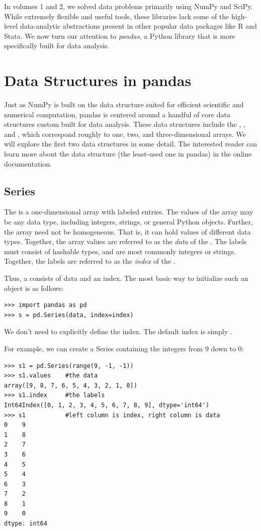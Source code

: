 \label{lab:pandas1}

In volumes 1 and 2, we solved data problems primarily using NumPy and SciPy.
While extremely flexible and useful tools, these libraries lack some of the high-level 
data-analytic abstractions present in other popular data packages like R and Stata.
We now turn our attention to \emph{pandas}, a Python library that is more specifically built
for data analysis.

\section*{Data Structures in pandas}
Just as NumPy is built on the  data structure suited for efficient scientific
and numerical computation, pandas is centered around a handful of core data structures
custom built for data analysis. These data structures include the , ,
and , which correspond roughly to one, two, and three-dimensional arrays.
We will explore the first two data structures in some detail.
The interested reader can learn more about the  data structure (the least-used one in pandas) in the online documentation.

\subsection*{Series}
The  is a one-dimensional array with labeled entries. The values of the array may be
any data type, including integers, strings, or general Python objects. Further, the array
need not be homogeneous. That is, it can hold values of different data types. Together,
the array values are referred to as the \emph{data} of the .
The labels must consist of hashable types, and are most commonly integers or strings.
Together, the labels are referred to as the \emph{index} of the .

Thus, a  consists of data and an index. The most basic way to initialize such an object
is as follows:
\begin{lstlisting}
>>> import pandas as pd
>>> s = pd.Series(data, index=index)
\end{lstlisting}
We don't need to explicitly define the index. The default index is simply .

For example, we can create a Series containing the integers from 9 down to 0:
\begin{lstlisting}
>>> s1 = pd.Series(range(9, -1, -1))
>>> s1.values    #the data
array([9, 8, 7, 6, 5, 4, 3, 2, 1, 0])
>>> s1.index     #the labels
Int64Index([0, 1, 2, 3, 4, 5, 6, 7, 8, 9], dtype='int64')
>>> s1           #left column is index, right column is data
0    9
1    8
2    7
3    6
4    5
5    4
6    3
7    2
8    1
9    0
dtype: int64
\end{lstlisting}

